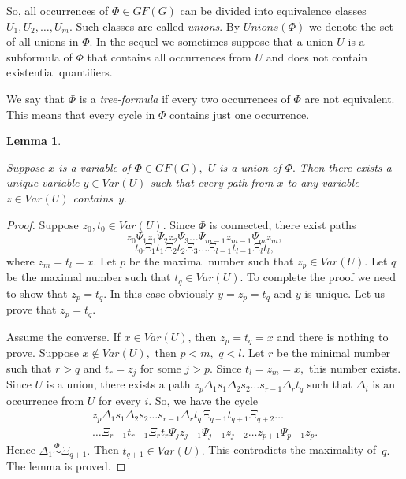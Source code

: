 \documentclass{au}
\theoremstyle{plain}
\newtheorem{lemma}{Lemma}
\theoremstyle{definition}
\theoremstyle{remark}
\numberwithin{equation}{section}
\begin{document}
So, all occurrences of $\Phi\in GF(G)$ can be divided into
equivalence classes $U_{1},U_{2},\ldots,U_{m}.$
Such classes are called \emph{unions}.
By $Unions(\Phi)$ we denote the set of all unions in $\Phi.$
In the sequel we sometimes suppose that
a union $U$ is a subformula of $\Phi$ that contains all occurrences from $U$
and does not contain existential quantifiers.

We say that $\Phi$ is a \emph{tree-formula} if
every two occurrences of $\Phi$ are not equivalent.
This means that
every cycle in $\Phi$ contains just one occurrence.

\begin{lemma}\label{edinstvenostPeremennoyVUnion}

Suppose $x$ is a variable of $\Phi\in GF(G),$
$U$ is a union of $\Phi.$
Then there exists a unique variable $y\in Var(U)$
such that every path from $x$ to any variable $z\in Var(U)$ contains~$y.$

\end{lemma}

\begin{proof}

Suppose $z_{0}, t_{0}\in Var(U).$
Since $\Phi$ is connected,
there exist paths
$$z_{0}\Psi_{1}z_{1}\Psi_{2}z_{2}\Psi_{3}\ldots \Psi_{m-1}z_{m-1}\Psi_{m}z_{m},$$
$$t_{0}\Xi_{1}t_{1}\Xi_{2}t_{2}\Xi_{3}\ldots \Xi_{l-1}t_{l-1}\Xi_{l}t_{l},$$
where $z_{m} = t_{l} = x.$
Let $p$ be the maximal number such that
$z_{p}\in Var(U).$
Let $q$ be the maximal number such that
$t_{q}\in Var(U).$
To complete the proof we need to show that $z_{p} = t_{q}.$
In this case obviously $y = z_{p} = t_{q}$ and $y$ is unique.
Let us prove that $z_{p} = t_{q}.$

Assume the converse.
If $x\in Var(U)$, then $z_{p} = t_{q} = x$ and there is nothing to prove.
Suppose $x\notin Var(U),$ then $p<m,$ $q<l.$
Let $r$ be the minimal number
such that
$r>q$ and $t_{r} = z_{j}$ for some $j>p.$
Since $t_{l} = z_{m} = x,$ this number exists.
Since $U$ is a union,
there exists a path
$z_{p}\Delta_{1}s_{1}\Delta_{2}s_{2}\ldots s_{r-1}\Delta_{r} t_{q}$
such that $\Delta_{i}$ is an occurrence from $U$ for every $i.$
So, we have the cycle
\begin{multline*}z_{p}\Delta_{1}s_{1}\Delta_{2}s_{2}\ldots s_{r-1}\Delta_{r} t_{q}
\Xi_{q+1}t_{q+1}\Xi_{q+2}\ldots \\ \ldots \Xi_{r-1}t_{r-1}\Xi_{r}t_{r}
\Psi_{j}z_{j-1}\Psi_{j-1}z_{j-2}\ldots z_{p+1}\Psi_{p+1}z_{p}.\end{multline*}
Hence $\Delta_{1}\overset{\Phi}\sim \Xi_{q+1}.$ Then $t_{q+1} \in Var(U).$
This contradicts the maximality of~$q.$
The lemma is proved.

\end{proof}
\end{document}
